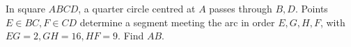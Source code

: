 In square $ABCD$, a quarter circle centred at $A$ passes through $B,D$. Points $E\in BC,F\in CD$ determine a segment meeting the arc in order $E,G,H,F$, with $EG=2,GH=16,HF=9$. Find $AB$.
